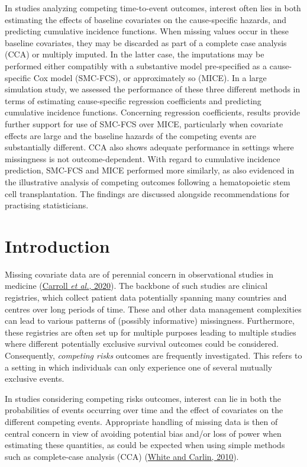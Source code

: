 \documentclass[
  letterpaper,
  DIV=11,
  numbers=noendperiod]{scrreprt}
\begin{document}
In studies analyzing competing time-to-event outcomes, interest often
lies in both estimating the effects of baseline covariates on the
cause-specific hazards, and predicting cumulative incidence functions.
When missing values occur in these baseline covariates, they may be
discarded as part of a complete case analysis (CCA) or multiply imputed.
In the latter case, the imputations may be performed either compatibly
with a substantive model pre-specified as a cause-specific Cox model
(SMC-FCS), or approximately so (MICE). In a large simulation study, we
assessed the performance of these three different methods in terms of
estimating cause-specific regression coefficients and predicting
cumulative incidence functions. Concerning regression coefficients,
results provide further support for use of SMC-FCS over MICE,
particularly when covariate effects are large and the baseline hazards
of the competing events are substantially different. CCA also shows
adequate performance in settings where missingness is not
outcome-dependent. With regard to cumulative incidence prediction,
SMC-FCS and MICE performed more similarly, as also evidenced in the
illustrative analysis of competing outcomes following a hematopoietic
stem cell transplantation. The findings are discussed alongside
recommendations for practising statisticians.

\hfill\break

\hypertarget{introduction-1}{%
\section{Introduction}\label{introduction-1}}

Missing covariate data are of perennial concern in observational studies
in medicine (\protect\hyperlink{ref-carrollHowAreMissing2020}{Carroll
\emph{et al.}, 2020}). The backbone of such studies are clinical
registries, which collect patient data potentially spanning many
countries and centres over long periods of time. These and other data
management complexities can lead to various patterns of (possibly
informative) missingness. Furthermore, these registries are often set up
for multiple purposes leading to multiple studies where different
potentially exclusive survival outcomes could be considered.
Consequently, \emph{competing risks} outcomes are frequently
investigated. This refers to a setting in which individuals can only
experience one of several mutually exclusive events.

In studies considering competing risks outcomes, interest can lie in
both the probabilities of events occurring over time and the effect of
covariates on the different competing events. Appropriate handling of
missing data is then of central concern in view of avoiding potential
bias and/or loss of power when estimating these quantities, as could be
expected when using simple methods such as complete-case analysis (CCA)
(\protect\hyperlink{ref-whiteBiasEfficiencyMultiple2010}{White and
Carlin, 2010}).
\end{document}

